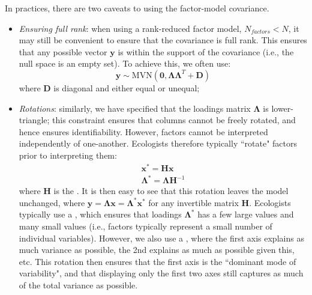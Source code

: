 In practices, there are two caveats to using the factor-model covariance.  
\begin{itemize}
    \item \textit{Ensuring full rank}:  when using a rank-reduced factor model, \(N_{factors}<N\), it may still be convenient to ensure that the covariance is full rank.  This ensures that any possible vector \(\mathbf{y}\) is within the support of the covariance (i.e., the null space is an empty set).  To achieve this, we often use:
\begin{equation}
    \mathbf{y} \sim \mathrm{MVN}( \mathbf{0}, \mathbf{\Lambda \Lambda}^T+\mathbf{D} )   
\end{equation}
    where \(\mathbf{D}\) is diagonal and either equal or unequal;

    \item \textit{Rotations}:  similarly, we have specified that the loadings matrix \(\mathbf{\Lambda}\) is lower-triangle;  this constraint ensures that columns cannot be freely rotated, and hence ensures identifiability.  However, factors cannot be interpreted independently of one-another.  Ecologists therefore typically ``rotate" factors prior to interpreting them:
\begin{equation} \label{eq:Chap4_rotations}
\begin{gathered}
    \mathbf{x}^* = \mathbf{Hx} \\
    \mathbf{\Lambda}^* = \mathbf{\Lambda H}^{-1} 
\end{gathered}    
\end{equation}
    where \( \mathbf{H} \) is the .  It is then easy to see that this rotation leaves the model unchanged, where \( \mathbf{y} = \mathbf{\Lambda x} = \mathbf{\Lambda}^*\mathbf{x}^* \) for any invertible matrix \(\mathbf{H}\).  Ecologists typically use a , which ensures that loadings \(\mathbf{\Lambda}^*\) has a few large values and many small values (i.e., factors typically represent a small number of individual variables).  However, we also use a  \cite{thorson_joint_2016}, where the first axis explains as much variance as possible, the 2nd explains as much as possible given this, etc.  This rotation then ensures that the first axis is the ``dominant mode of variability", and that displaying only the first two axes still captures as much of the total variance as possible.
\end{itemize}

